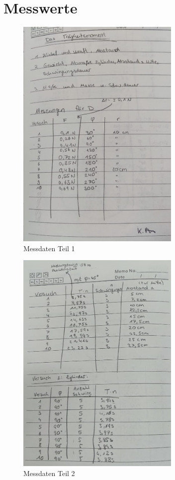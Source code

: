 \newpage

\section{Messwerte}
\begin{figure}
    \centering
    \includegraphics[width=0.7\textwidth]{index.jpg}
    \caption{Messdaten Teil 1}
    \label{fig:M1}
  \end{figure}

\begin{figure}
    \centering
    \includegraphics[width=0.7\textwidth]{index2.jpg}
    \caption{Messdaten Teil 2}
    \label{fig:M1}
\end{figure}

